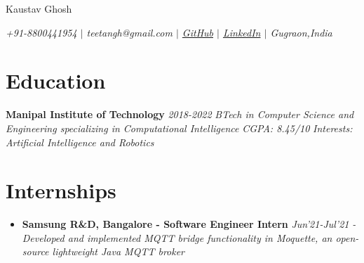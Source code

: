 \documentclass{article}
\makeatletter
\renewcommand{\maketitle}{
    \begin{flushleft}        
        {\huge\rmfamily
        \theauthor}\newline
        \vspace{0.1em}
        \textit{teetangh@gmail.com -- github.com/teetangh}\newline
        \textit{Contact No. -- +91-8800441954}\newline
        \textit{Manipal Institute of Technology}\newline
        \textit{B.Tech in \textbf{Computer Science \& Engineering}}
        \textit{2018 - 2022}\newline
        \textit{Minor in \textbf{Computational Intelligence}}\newline
        \textit{CGPA: 8.45/10}\newline
    \end{flushleft}

}
\makeatother
\begin{document}
\thispagestyle{empty}  %


\begin{center}
    \huge{Kaustav Ghosh}

    \normalsize{
        \textit{
            +91-8800441954 \(|\)
            teetangh@gmail.com \(|\)
            \href{https://www.github.com/teetangh}{GitHub} \(|\)
            \href{https://www.linkedin.com/in/kaustav-ghosh-1538651bb/}{LinkedIn} \(|\)
            Gugraon,India
        }}
\end{center}

\section*{Education}

\textbf{Manipal Institute of Technology} \hfill \textit{2018-2022}
\textmd{\newline \textit{BTech in Computer Science and Engineering specializing in Computational Intelligence}} \hfill \textit{CGPA: 8.45/10}
\textmd{\newline \textit{Interests: Artificial Intelligence and Robotics}}

\section*{Internships}

\begin{itemize}
    \item{\textbf{\large{Samsung R\&D, Bangalore - Software Engineer Intern}}} \hfill \textit{Jun'21-Jul'21}
          \newline
          \textit{- Developed and implemented MQTT bridge functionality in Moquette, an open-source lightweight Java MQTT broker}
\end{itemize}
\end{document}
